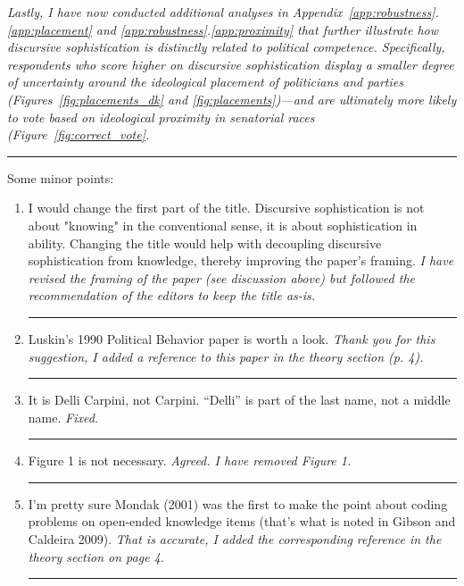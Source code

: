 \textit{Lastly, I have now conducted additional analyses in Appendix~\ref{app:robustness}.\ref{app:placement} and \ref{app:robustness}.\ref{app:proximity} that further illustrate how discursive sophistication is distinctly related to {\normalfont political} competence. Specifically, respondents who score higher on discursive sophistication display a smaller degree of uncertainty around the ideological placement of politicians and parties (Figures~\ref{fig:placements_dk} and \ref{fig:placements})---and are ultimately more likely to vote based on ideological proximity in senatorial races (Figure~\ref{fig:correct_vote}.}


\rule{\linewidth}{.01cm}

Some minor points:\vspace{-1em}
\begin{enumerate}
\item I would change the first part of the title. Discursive sophistication is not about "knowing" in the conventional sense, it is about sophistication in ability. Changing the title would help with decoupling discursive sophistication from knowledge, thereby improving the paper's framing.
\vspace{.5em}\newline\textit{I have revised the framing of the paper (see discussion above) but followed the recommendation of the editors to keep the title as-is.}\newline\rule{\linewidth}{.01cm}
\item Luskin's 1990 Political Behavior paper is worth a look.
\vspace{.5em}\newline\textit{Thank you for this suggestion, I added a reference to this paper in the theory section (p. 4).}\newline\rule{\linewidth}{.01cm}
\item It is Delli Carpini, not Carpini. ``Delli'' is part of the last name, not a middle name.
\vspace{.5em}\newline\textit{Fixed.}\newline\rule{\linewidth}{.01cm}
\item Figure 1 is not necessary.
\vspace{.5em}\newline\textit{Agreed. I have removed Figure 1.}\newline\rule{\linewidth}{.01cm}
\item I'm pretty sure Mondak (2001) was the first to make the point about coding problems on open-ended knowledge items (that's what is noted in Gibson and Caldeira 2009).
\vspace{.5em}\newline\textit{That is accurate, I added the corresponding reference in the theory section on page 4.}\newline\rule{\linewidth}{.01cm}
\end{enumerate}

